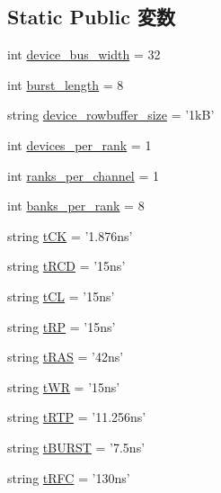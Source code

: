 \subsection*{Static Public 変数}
\begin{DoxyCompactItemize}
\item 
int \hyperlink{classDRAMCtrl_1_1LPDDR2__S4__1066__x32_ac980afb64b962aec673eeadb21ea8b0e}{device\_\-bus\_\-width} = 32
\item 
int \hyperlink{classDRAMCtrl_1_1LPDDR2__S4__1066__x32_afeba385888f1ce3063d25f20c0e7a89b}{burst\_\-length} = 8
\item 
string \hyperlink{classDRAMCtrl_1_1LPDDR2__S4__1066__x32_ab24d9a52c5c94331e40478cc93e9abe1}{device\_\-rowbuffer\_\-size} = '1kB'
\item 
int \hyperlink{classDRAMCtrl_1_1LPDDR2__S4__1066__x32_a60039c77757fd0118d81754311d71cfb}{devices\_\-per\_\-rank} = 1
\item 
int \hyperlink{classDRAMCtrl_1_1LPDDR2__S4__1066__x32_ab610af52b1f27db17e9de304176a80a8}{ranks\_\-per\_\-channel} = 1
\item 
int \hyperlink{classDRAMCtrl_1_1LPDDR2__S4__1066__x32_ac43360fda587200e99a090d69163e089}{banks\_\-per\_\-rank} = 8
\item 
string \hyperlink{classDRAMCtrl_1_1LPDDR2__S4__1066__x32_a78016df5bd6c91551bcf487d3d665ebe}{tCK} = '1.876ns'
\item 
string \hyperlink{classDRAMCtrl_1_1LPDDR2__S4__1066__x32_a31691ebf1f58ff89b00f261f5adea8e2}{tRCD} = '15ns'
\item 
string \hyperlink{classDRAMCtrl_1_1LPDDR2__S4__1066__x32_a009c2614e5d317cb4805a4a98ace1b19}{tCL} = '15ns'
\item 
string \hyperlink{classDRAMCtrl_1_1LPDDR2__S4__1066__x32_aeda425967c3cf2880bdc1640e9733439}{tRP} = '15ns'
\item 
string \hyperlink{classDRAMCtrl_1_1LPDDR2__S4__1066__x32_a1b5f15dad9d492ce5d0167e1581de8cc}{tRAS} = '42ns'
\item 
string \hyperlink{classDRAMCtrl_1_1LPDDR2__S4__1066__x32_a9d8360f5123eaf9b5b6013adca83d1ae}{tWR} = '15ns'
\item 
string \hyperlink{classDRAMCtrl_1_1LPDDR2__S4__1066__x32_ac0793c2fe127d7331efb7012e82dae77}{tRTP} = '11.256ns'
\item 
string \hyperlink{classDRAMCtrl_1_1LPDDR2__S4__1066__x32_af962cc8ff13de9c28027368562b67c1e}{tBURST} = '7.5ns'
\item 
string \hyperlink{classDRAMCtrl_1_1LPDDR2__S4__1066__x32_a05307f048be759575436bb4a58206f04}{tRFC} = '130ns'

\end{DoxyCompactItemize}
